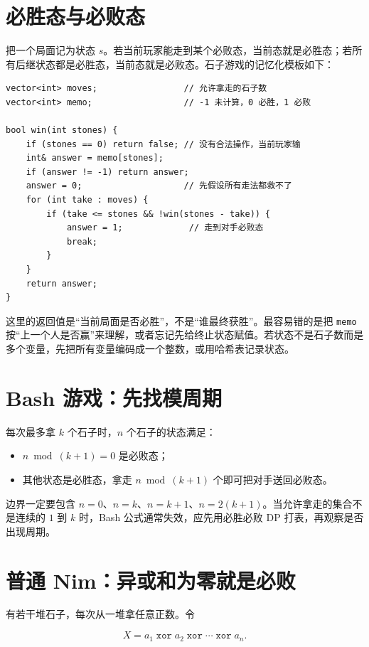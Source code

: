 \documentclass[UTF8,openany,oneside,zihao=-4]{ctexbook}
\begin{document}
\section{必胜态与必败态}

把一个局面记为状态 $s$。若当前玩家能走到某个必败态，当前态就是必胜态；若所有后继状态都是必胜态，当前态就是必败态。石子游戏的记忆化模板如下：

\begin{lstlisting}
vector<int> moves;                 // 允许拿走的石子数
vector<int> memo;                  // -1 未计算，0 必胜，1 必败

bool win(int stones) {
    if (stones == 0) return false; // 没有合法操作，当前玩家输
    int& answer = memo[stones];
    if (answer != -1) return answer;
    answer = 0;                    // 先假设所有走法都救不了
    for (int take : moves) {
        if (take <= stones && !win(stones - take)) {
            answer = 1;             // 走到对手必败态
            break;
        }
    }
    return answer;
}
\end{lstlisting}

这里的返回值是“当前局面是否必胜”，不是“谁最终获胜”。最容易错的是把 \lstinline|memo| 按“上一个人是否赢”来理解，或者忘记先给终止状态赋值。若状态不是石子数而是多个变量，先把所有变量编码成一个整数，或用哈希表记录状态。

\section{Bash 游戏：先找模周期}

每次最多拿 $k$ 个石子时，$n$ 个石子的状态满足：

\begin{itemize}
  \item $n \bmod (k+1)=0$ 是必败态；
  \item 其他状态是必胜态，拿走 $n\bmod(k+1)$ 个即可把对手送回必败态。
\end{itemize}

边界一定要包含 $n=0$、$n=k$、$n=k+1$、$n=2(k+1)$。当允许拿走的集合不是连续的 $1$ 到 $k$ 时，Bash 公式通常失效，应先用必胜必败 DP 打表，再观察是否出现周期。

\section{普通 Nim：异或和为零就是必败}

有若干堆石子，每次从一堆拿任意正数。令

\[
X=a_1\mathbin{\mathop{\mathtt{xor}}}a_2\mathbin{\mathop{\mathtt{xor}}}\cdots\mathbin{\mathop{\mathtt{xor}}}a_n.
\]
\end{document}
